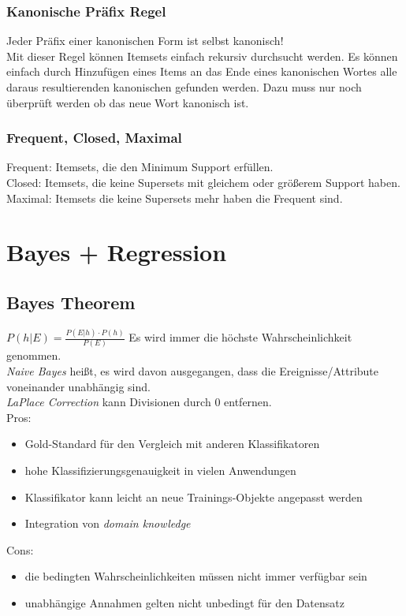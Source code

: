 \documentclass[a4paper]{scrartcl}
\begin{document}
\subsubsection{Kanonische Präfix Regel}
Jeder Präfix einer kanonischen Form ist selbst kanonisch!\\
Mit dieser Regel können Itemsets einfach rekursiv durchsucht werden. Es können einfach durch Hinzufügen eines Items an das Ende eines kanonischen Wortes alle daraus resultierenden kanonischen gefunden werden. Dazu muss nur noch überprüft werden ob das neue Wort kanonisch ist.

\subsubsection{Frequent, Closed, Maximal}
Frequent: Itemsets, die den Minimum Support erfüllen.\\
Closed: Itemsets, die keine Supersets mit gleichem oder größerem Support haben.\\
Maximal: Itemsets die keine Supersets mehr haben die Frequent sind.\\

\section{Bayes + Regression}
\subsection{Bayes Theorem}
$P(h|E)=\frac{P(E|h)\cdot P(h)}{P(E)} $
Es wird immer die höchste Wahrscheinlichkeit genommen.\\
\textit{Naive Bayes} heißt, es wird davon ausgegangen, dass die Ereignisse/Attribute voneinander unabhängig sind.\\
\textit{LaPlace Correction} kann Divisionen durch 0 entfernen.\\
Pros:
\begin{itemize}
\item Gold-Standard für den Vergleich mit anderen Klassifikatoren
\item hohe Klassifizierungsgenauigkeit in vielen Anwendungen
\item Klassifikator kann leicht an neue Trainings-Objekte angepasst werden
\item Integration von \textit{domain knowledge}
\end{itemize}
Cons:
\begin{itemize}
\item die bedingten Wahrscheinlichkeiten müssen nicht immer verfügbar sein
\item unabhängige Annahmen gelten nicht unbedingt für den Datensatz
\end{itemize}
\end{document}
